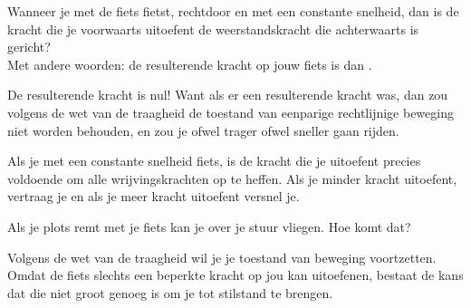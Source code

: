 \documentclass{ximera}
\begin{document}
\begin{exercise}
	Wanneer je met de fiets fietst, rechtdoor en met een constante snelheid, dan is de kracht die je voorwaarts uitoefent 
	de weerstandskracht die achterwaarts is gericht? 
	\\
	Met andere woorden: de resulterende kracht op jouw fiets is dan
	.
	\begin{oplossing}
		De resulterende kracht is nul! 
		Want als er een resulterende kracht was, dan zou volgens de wet van de traagheid de toestand van eenparige rechtlijnige beweging niet worden behouden, en zou je ofwel trager ofwel sneller gaan rijden.

		Als je met een constante snelheid fiets, is de kracht die je uitoefent precies voldoende om alle wrijvingskrachten op te heffen. Als je minder kracht uitoefent, vertraag je en als je meer kracht uitoefent versnel je.
	\end{oplossing}
\end{exercise}

\begin{exercise}
	Als je plots remt met je fiets kan je over je stuur vliegen. Hoe komt dat?
	\begin{oplossing}
		Volgens de wet van de traagheid wil je je toestand van beweging voortzetten. Omdat de fiets slechts een beperkte kracht op jou kan uitoefenen, bestaat de kans dat die niet groot genoeg is om je tot stilstand te brengen.
	\end{oplossing}
\end{exercise}
\end{document}

